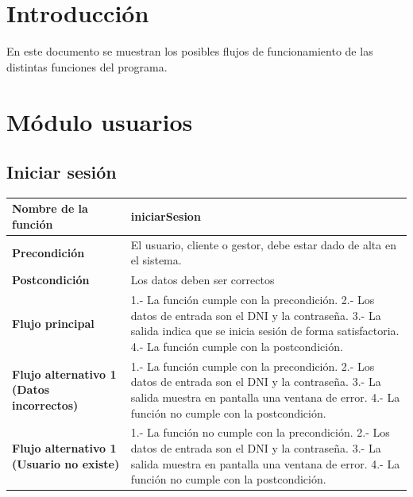 \documentclass[12pt]{article}
\begin{document}
\section*{Introducción}
En este documento se muestran los posibles flujos de funcionamiento de las distintas funciones del programa.

\section{Módulo usuarios}
\subsection{Iniciar sesión}
\begin{table}[H]
    \centering
    \begin{tabular}{|>{\bfseries}l|l|}
        \hline
        Nombre de la función                             & iniciarSesion                                                        \\
        \hline
        Precondición                                     & El usuario, cliente o gestor, debe estar dado de alta en el sistema. \\
        \hline
        Postcondición                                    & Los datos deben ser correctos                                        \\
        \hline
        Flujo principal                                  &
        1.- La función cumple con la precondición.
        2.- Los datos de entrada son el DNI y la contraseña.
        3.- La salida indica que se inicia sesión de forma satisfactoria.
        4.- La función cumple con la postcondición.
        \\
        \hline
        Flujo alternativo 1 \newline (Datos incorrectos) &
        1.- La función cumple con la precondición.
        2.- Los datos de entrada son el DNI y la contraseña.
        3.- La salida muestra en pantalla una ventana de error.
        4.- La función no cumple con la postcondición.                                                                          \\
        \hline
        Flujo alternativo 1 \newline (Usuario no existe) &
        1.- La función no cumple con la precondición.
        2.- Los datos de entrada son el DNI y la contraseña.
        3.- La salida muestra en pantalla una ventana de error.
        4.- La función no cumple con la postcondición.                                                                          \\
    \end{tabular}
\end{table}
\end{document}
